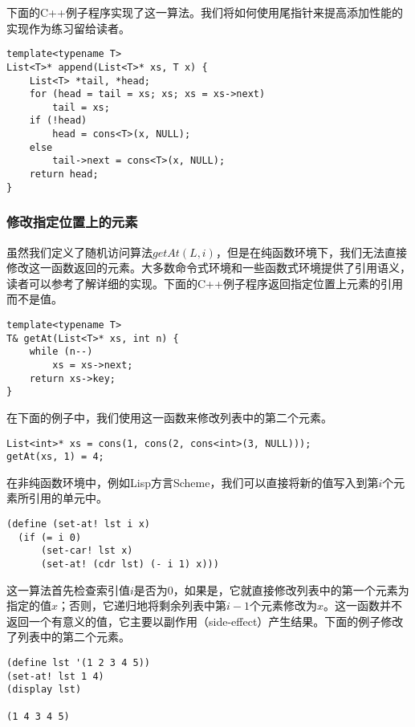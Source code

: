 \documentclass[UTF8]{article}
\begin{document}
下面的C++例子程序实现了这一算法。我们将如何使用尾指针来提高添加性能的实现作为练习留给读者。

\lstset{language=C++}
\begin{lstlisting}
template<typename T>
List<T>* append(List<T>* xs, T x) {
    List<T> *tail, *head;
    for (head = tail = xs; xs; xs = xs->next)
        tail = xs;
    if (!head)
        head = cons<T>(x, NULL);
    else
        tail->next = cons<T>(x, NULL);
    return head;
}
\end{lstlisting}

\subsubsection{修改指定位置上的元素}

虽然我们定义了随机访问算法$getAt(L, i)$，但是在纯函数环境下，我们无法直接修改这一函数返回的元素。大多数命令式环境和一些函数式环境提供了引用语义，读者可以参考\cite{mittype}了解详细的实现。下面的C++例子程序返回指定位置上元素的引用而不是值。

\lstset{language=C++}
\begin{lstlisting}
template<typename T>
T& getAt(List<T>* xs, int n) {
    while (n--)
        xs = xs->next;
    return xs->key;
}
\end{lstlisting}

在下面的例子中，我们使用这一函数来修改列表中的第二个元素。

\begin{lstlisting}
List<int>* xs = cons(1, cons(2, cons<int>(3, NULL)));
getAt(xs, 1) = 4;
\end{lstlisting}

在非纯函数环境中，例如Lisp方言Scheme，我们可以直接将新的值写入到第$i$个元素所引用的单元中。

\lstset{language=Lisp}
\begin{lstlisting}
(define (set-at! lst i x)
  (if (= i 0)
      (set-car! lst x)
      (set-at! (cdr lst) (- i 1) x)))
\end{lstlisting}

这一算法首先检查索引值$i$是否为0，如果是，它就直接修改列表中的第一个元素为指定的值$x$；否则，它递归地将剩余列表中第$i-1$个元素修改为$x$。这一函数并不返回一个有意义的值，它主要以副作用（side-effect）产生结果。下面的例子修改了列表中的第二个元素。

\begin{lstlisting}
(define lst '(1 2 3 4 5))
(set-at! lst 1 4)
(display lst)

(1 4 3 4 5)
\end{lstlisting}
\end{document}
